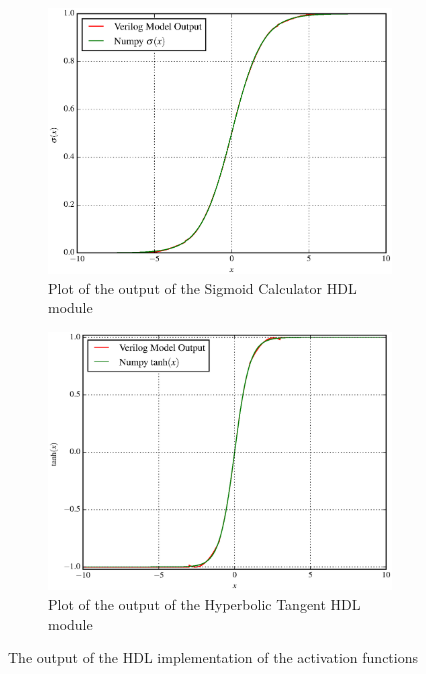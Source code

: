 \begin{figure}
    \centering
    \begin{subfigure}{0.85\linewidth}
        \centering
        \includegraphics[width=\linewidth]{figures/nonlin-out.eps}
        \caption[Plot of the output of the Sigmoid Calculator HDL module]{Plot of the output of the Sigmoid Calculator HDL module}
        \label{fig:nonlin-out-sig}
    \end{subfigure}
    \begin{subfigure}{0.85\linewidth}
        \centering
        \includegraphics[width=\linewidth]{figures/nonlin-out-tanh.eps}
        \caption[Plot of the output of the Hyperbolic Tangent HDL module]{Plot of the output of the Hyperbolic Tangent HDL module}
        \label{fig:nonlin-out-tanh}
    \end{subfigure}
    \caption[The output of the HDL implementation of the activation functions]{The output of the HDL implementation of the activation functions}
    \label{fig:nonlin-out}
\end{figure}

